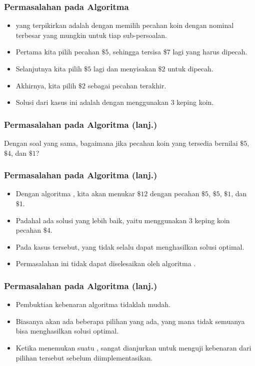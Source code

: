 \begin{frame}
  \frametitle{Permasalahan pada Algoritma \fGreedy}
  \begin{itemize}
    \item \fGreedyChoice yang terpikirkan adalah dengan memilih pecahan koin dengan nominal terbesar yang mungkin untuk tiap sub-persoalan.
    \item Pertama kita pilih pecahan $\$5$, sehingga tersisa $\$7$ lagi yang harus dipecah.
    \item Selanjutnya kita pilih $\$5$ lagi dan menyisakan $\$2$ untuk dipecah.
    \item Akhirnya, kita pilih $\$2$ sebagai pecahan terakhir.
    \item Solusi dari kasus ini adalah dengan menggunakan 3 keping koin.
  \end{itemize}
\end{frame}

\begin{frame}
  \frametitle{Permasalahan pada Algoritma \fGreedy (lanj.)}
  \begin{center}
    Dengan soal yang sama, bagaimana jika pecahan koin yang tersedia bernilai $\$5$, $\$4$, dan $\$1$?
  \end{center}
\end{frame}

\begin{frame}
  \frametitle{Permasalahan pada Algoritma \fGreedy (lanj.)}
  \begin{itemize}
    \item Dengan algoritma \fGreedy, kita akan menukar  $\$12$ dengan pecahan $\$5$, $\$5$, $\$1$, dan $\$1$.
    \item Padahal ada solusi yang lebih baik, yaitu menggunakan 3 keping koin pecahan $\$4$.
    \item Pada kasus tersebut, \fGreedyChoice yang tidak selalu dapat menghasilkan solusi optimal.
    \item Permasalahan ini tidak dapat diselesaikan oleh algoritma \fGreedy.
  \end{itemize}
\end{frame}

\begin{frame}
  \frametitle{Permasalahan pada Algoritma \fGreedy (lanj.)}
  \begin{itemize}
    \item Pembuktian kebenaran algoritma \fGreedy tidaklah mudah.
    \item Biasanya akan ada beberapa pilihan  \fGreedyChoice yang ada, yang mana tidak semuanya bisa menghasilkan solusi optimal.
    \item Ketika menemukan suatu \fGreedyChoice, sangat dianjurkan untuk menguji kebenaran dari pilihan tersebut sebelum diimplementasikan.
  \end{itemize}
\end{frame}

